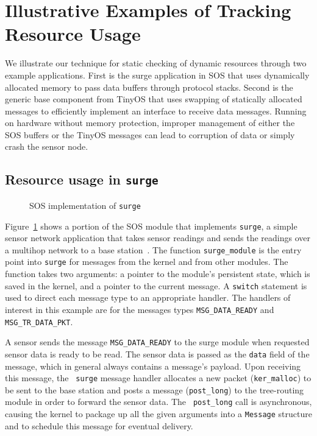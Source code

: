 \section{Illustrative Examples of Tracking Resource Usage}
\label{sec:example}

We illustrate our technique for static checking of dynamic resources
through two example applications.  First is the surge application in
SOS that uses dynamically allocated memory to pass data buffers through
protocol stacks.  Second is the generic base component from TinyOS
that uses swapping of statically allocated messages to efficiently
implement an interface to receive data messages.  Running on hardware
without memory protection, improper management of either the SOS
buffers or the TinyOS messages can lead to corruption of data or
simply crash the sensor node.

%
%


\subsection{Resource usage in {\tt surge}}

\begin{figure}[t]

\caption{SOS implementation of {\tt surge}\label{fig:surge}}
\end{figure}

Figure~\ref{fig:surge} shows a portion of the SOS module that
implements {\tt surge}, a simple sensor network application that takes
sensor readings and sends the readings over a multihop network to a
base station~\cite{nesC}.  The function {\tt surge\_module} is the
entry point into {\tt surge} for messages from the kernel and from
other modules.  The function takes two arguments: a pointer to the
module's persistent state, which is saved in the kernel, and a pointer
to the current message.  A {\tt switch} statement is used to direct
each message type to an appropriate handler.  The handlers of interest
in this example are for the messages types {\tt MSG\_DATA\_READY} and
{\tt MSG\_TR\_DATA\_PKT}.

A sensor sends the message {\tt MSG\_DATA\_READY} to the surge module
when requested sensor data is ready to be read. The sensor data is
passed as the {\tt data} field of the message, which in general always
contains a message's payload.  Upon receiving this message, the {\tt
surge} message handler allocates a new packet ({\tt ker\_malloc}) to
be sent to the base station and posts a message ({\tt post\_long}) to
the tree-routing module in order to forward the sensor data.  The {\tt
post\_long} call is asynchronous, causing the kernel to package up all
the given arguments into a {\tt Message} structure and to schedule
this message for eventual delivery.

